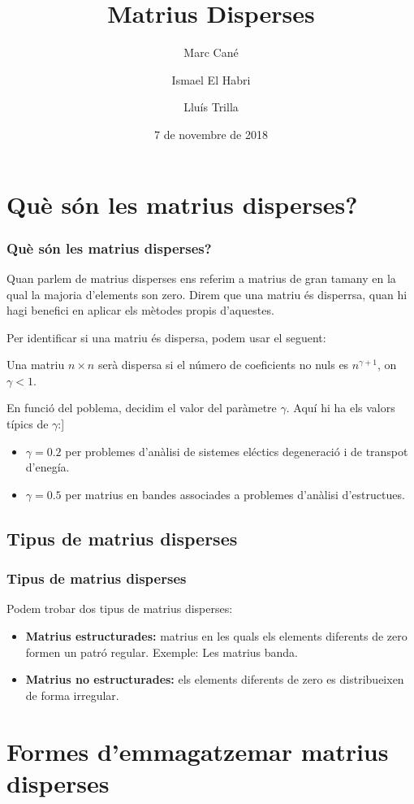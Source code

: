 \documentclass{beamer}
\title{Matrius Disperses}
\author{Marc Cané \and Ismael El Habri \and Lluís Trilla}
\date[KPT 2004] %
{7 de novembre de 2018}
\begin{document}
\frame{\titlepage}

\section{Què són les matrius disperses?}
  \begin{frame}
    \frametitle{Què són les matrius disperses?}
    Quan parlem de matrius disperses ens referim a matrius de gran tamany en la qual la majoria d'elements son zero. Direm que 
una matriu és disperrsa, quan hi hagi benefici en aplicar els mètodes propis d'aquestes. 
  \end{frame}
  \begin{frame}
   Per identificar si una matriu és dispersa, podem usar el seguent:

Una matriu $n \times n$ serà dispersa si el número de coeficients no nuls es $n^{\gamma+1}$, on $\gamma < 1$.

En funció del poblema, decidim el valor del paràmetre $\gamma$. Aquí hi ha els valors típics de $\gamma$:]
\begin{itemize}
\item $\gamma=0.2$ per problemes d'anàlisi de sistemes eléctics degeneració i de transpot d'enegía.
\item $\gamma=0.5$ per matrius en bandes associades a problemes d'anàlisi d'estructues.
\end {itemize}
  \end{frame}
  
  \subsection{Tipus de matrius disperses}
  \begin{frame}
  \frametitle{Tipus de matrius disperses}
Podem trobar dos tipus de matrius disperses:
\begin{itemize}
\item \textbf{Matrius estructurades:} matrius en les quals els elements diferents de zero formen un patró regular. Exemple: Les matrius banda.
\item \textbf{Matrius no estructurades:} els elements diferents de zero es distribueixen de forma irregular.
\end{itemize}  
  \end{frame}
  
%
%  

\section[Emmagatzematge]{Formes d'emmagatzemar matrius disperses}
\end{document}
